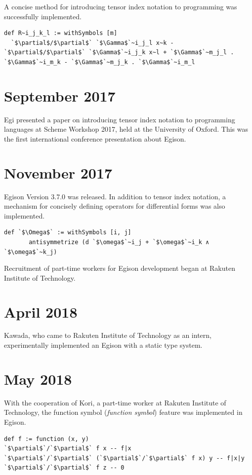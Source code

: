 A concise method for introducing tensor index notation to programming was successfully implemented.
\begin{lstlisting}[language=egison,numbers=none]
def R~i_j_k_l := withSymbols [m]
  `$\partial$/$\partial$` `$\Gamma$`~i_j_l x~k - `$\partial$/$\partial$` `$\Gamma$`~i_j_k x~l + `$\Gamma$`~m_j_l . `$\Gamma$`~i_m_k - `$\Gamma$`~m_j_k . `$\Gamma$`~i_m_l
\end{lstlisting}

\section*{September 2017}

Egi presented a paper on introducing tensor index notation to programming languages at Scheme Workshop 2017, held at the University of Oxford.
This was the first international conference presentation about Egison.

\section*{November 2017}

Egison Version 3.7.0 was released.
In addition to tensor index notation, a mechanism for concisely defining operators for differential forms was also implemented.
\begin{lstlisting}[language=egison,numbers=none]
def `$\Omega$` := withSymbols [i, j]
       antisymmetrize (d `$\omega$`~i_j + `$\omega$`~i_k ∧ `$\omega$`~k_j)
\end{lstlisting}

Recruitment of part-time workers for Egison development began at Rakuten Institute of Technology.

\section*{April 2018}

Kawada, who came to Rakuten Institute of Technology as an intern, experimentally implemented an Egison with a static type system.

\section*{May 2018}

With the cooperation of Kori, a part-time worker at Rakuten Institute of Technology, the function symbol (\emph{function symbol}) feature was implemented in Egison.
\begin{lstlisting}[language=egison,numbers=none]
def f := function (x, y)
`$\partial$`/`$\partial$` f x -- f|x
`$\partial$`/`$\partial$` (`$\partial$`/`$\partial$` f x) y -- f|x|y
`$\partial$`/`$\partial$` f z -- 0
\end{lstlisting}

